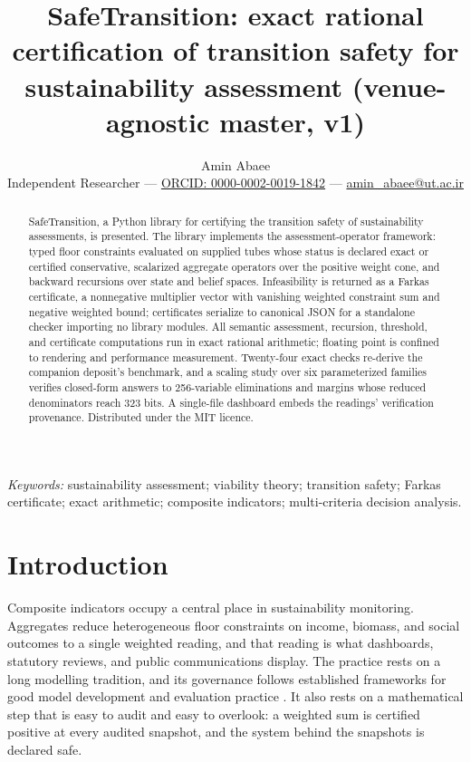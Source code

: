 \documentclass[11pt]{article}
\title{SafeTransition: exact rational certification of transition safety for
sustainability assessment (venue-agnostic master, v1)}
\author{Amin Abaee\\[2pt]
\small Independent Researcher ---
\href{https://orcid.org/0000-0002-0019-1842}{ORCID: 0000-0002-0019-1842} ---
\href{mailto:amin\_abaee@ut.ac.ir}{amin\_abaee@ut.ac.ir}}
\date{}
\begin{document}
\maketitle

\begin{abstract}
SafeTransition, a Python library for certifying the transition safety of
sustainability assessments, is presented. The library implements the
assessment-operator framework: typed floor constraints evaluated on
supplied tubes whose status is declared exact or certified conservative,
scalarized aggregate operators over the positive weight cone, and backward
recursions over state and belief spaces. Infeasibility is returned as a
Farkas certificate, a nonnegative multiplier vector with vanishing
weighted constraint sum and negative weighted bound; certificates
serialize to canonical JSON for a standalone checker importing no
library modules. All semantic assessment, recursion, threshold, and
certificate computations run in exact rational arithmetic; floating point
is confined to rendering and performance measurement. Twenty-four exact
checks re-derive the companion deposit's benchmark, and a scaling study
over six parameterized families verifies closed-form answers to
256-variable eliminations and margins whose reduced denominators reach
323 bits. A single-file dashboard embeds the readings' verification
provenance. Distributed under the MIT licence.
\end{abstract}

\noindent\textit{Keywords:} sustainability assessment; viability theory;
transition safety; Farkas certificate; exact arithmetic; composite
indicators; multi-criteria decision analysis.


\section{Introduction}\label{sec:introduction}

Composite indicators occupy a central place in sustainability monitoring.
Aggregates reduce heterogeneous floor constraints on income, biomass, and
social outcomes to a single weighted reading, and that reading is what
dashboards, statutory reviews, and public communications display. The
practice rests on a long modelling tradition, and its governance follows
established frameworks for good model development and evaluation practice
\citep{Jakeman2006}. It also rests on a mathematical step that
is easy to audit and easy to overlook: a weighted sum is certified positive
at every audited snapshot, and the system behind the snapshots is declared
safe.
\end{document}
